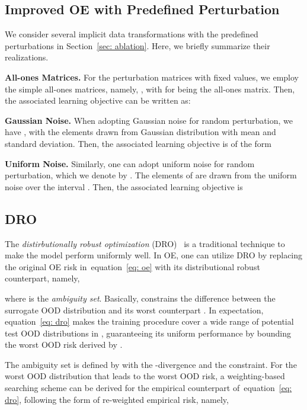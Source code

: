 \documentclass{article} \usepackage{iclr2022_conference,times}
\def\eqref#1{equation~\ref{#1}}
\begin{document}
\subsection{Improved OE with Predefined Perturbation}

We consider several implicit data transformations with the predefined perturbations in Section~\ref{sec: ablation}. Here, we briefly summarize their realizations.

\textbf{All-ones Matrices.} For the perturbation matrices with fixed values, we employ the simple all-ones matrices, namely, , with  for  being the all-ones matrix. Then, the associated learning objective can be written as:


\textbf{Gaussian Noise.} When adopting Gaussian noise for random perturbation, we have , with the elements drawn from Gaussian distribution with  mean and  standard deviation. Then, the associated learning objective is of the form


\textbf{Uniform Noise.} Similarly, one can adopt uniform noise for random perturbation, which we denote by . The elements of  are drawn from the uniform noise over the interval . Then, the associated learning objective is 

 






\subsection{DRO}
\label{sec: dro}


The \emph{distirbutionally robust optimization} (DRO)~\citep{rahimian2019distributionally} is a traditional technique to make the model perform uniformly well. In OE, one can utilize DRO by replacing the original OE risk in~\eqref{eq: oe} with its distributional robust counterpart, namely,

where  is the \emph{ambiguity set}. Basically,  constrains the difference between the surrogate OOD distribution  and its worst counterpart . In expectation, \eqref{eq: dro} makes the training procedure cover a wide range of potential test OOD distributions in , guaranteeing its uniform performance by bounding the worst OOD risk derived by .


The ambiguity set  is defined by  with  the -divergence and  the constraint. For the worst OOD distribution that leads to the worst OOD risk, a weighting-based searching scheme can be derived for the empirical counterpart of~\eqref{eq: dro}, following the form of re-weighted empirical risk, namely,
\end{document}
